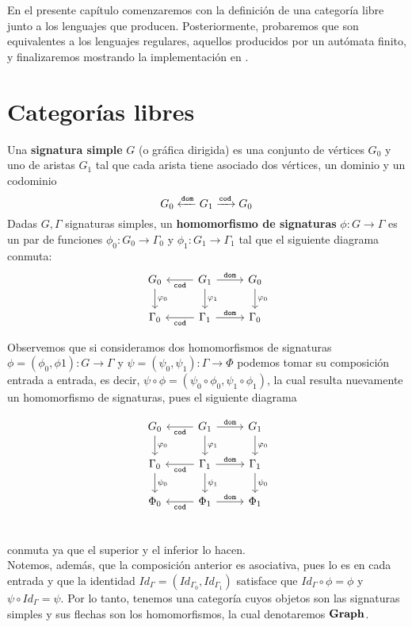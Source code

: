 \documentclass[../main.tex]{subfiles}
\begin{document}
	
En el presente capítulo comenzaremos con la definición de una categoría libre junto a los lenguajes que producen. Posteriormente, probaremos que son equivalentes a los lenguajes regulares, aquellos producidos por un autómata finito, y finalizaremos mostrando la implementación en .
\section{Categorías libres}
\begin{dfn}
	Una \textbf{signatura simple} \(G\) (o gráfica dirigida) es una conjunto de vértices \(G_0\) y uno de aristas \(G_1\) tal que cada arista tiene asociado dos vértices, un dominio y un codominio
	$$G_0 \xleftarrow{\tt{dom}} G_1 \xrightarrow{\tt{cod}} G_0$$
	Dadas \( G, \Gamma\) signaturas simples, un \textbf{homomorfismo de signaturas} \( \phi:G \to \Gamma\) es un par de funciones \( \phi_0: G_0 \to \Gamma_0\) y \( \phi_1: G_1 \to \Gamma_1\) tal que el siguiente diagrama conmuta: 
	\[
	\begin{tikzcd}
		G_0 \arrow{d}{\phi_0} & G_1 \arrow{r}{\tt{dom}} \arrow{l}{\tt{cod}} \arrow{d}{\phi_1} & G_0 \arrow{d}{\phi_0} \\
		\Gamma_0 & \Gamma_1 \arrow{r}{\tt{dom}} \arrow{l}{\tt{cod}} & \Gamma_0
	\end{tikzcd}
	\]
\end{dfn}

Observemos que si consideramos dos homomorfismos de signaturas $\phi=(\phi_0, \phi 1): G \to \Gamma$ y $\psi =(\psi _0, \psi_1): \Gamma \to \Phi$ 
podemos tomar su composición entrada a entrada, es decir, $\psi \circ \phi = (\psi_0 \circ \phi_0,\psi_1 \circ \phi_1)$, la  cual resulta nuevamente un homomorfismo de signaturas, pues el siguiente diagrama

\[
\begin{tikzcd}
	G_0 \arrow{d}{\phi_0} & G_1 \arrow{r}{\tt{dom}} \arrow{l}{\tt{cod}} \arrow{d}{\phi_1} & G_1 \arrow{d}{\phi_0} \\
	\Gamma_0 \arrow{d}{\psi_0} & \Gamma_1 \arrow{r}{\tt{dom}} \arrow{l}{\tt{cod}} \arrow{d}{\psi_1} & \Gamma_1 \arrow{d}{\psi_0} \\
	\Phi_0 & \Phi_1 \arrow{r}{\tt{dom}} \arrow{l}{\tt{cod}} & \Phi_1 \\
\end{tikzcd} 
\]

conmuta ya que el superior y el inferior lo hacen. \\
Notemos, además, que la composición anterior es asociativa, pues lo es en cada entrada y que la identidad $Id_\Gamma=(Id_{\Gamma_0}, Id_{\Gamma_1})$ 
satisface que $Id_\Gamma \circ \phi = \phi$ y $\psi \circ Id_\Gamma = \psi$. Por lo tanto, tenemos una categoría cuyos objetos son las signaturas simples y sus flechas son los homomorfismos, la cual denotaremos $\bf{Graph}$. \\
\end{document}
